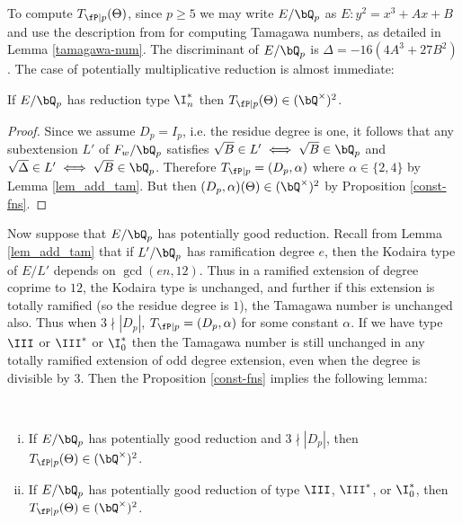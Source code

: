 To compute $T_{\fP \mid p}(\Theta)$, since $p \geq 5$ we may write $E / \bQ_p$ as $E \colon y^2 = x^3 + A x + B$ and use the description from \cite{reg-const} for computing Tamagawa numbers, as detailed in Lemma \ref{tamagawa-num}. The discriminant of $E / \bQ_p$ is $\Delta = -16(4A^3 + 27 B^2)$. The case of potentially multiplicative reduction is almost immediate:

\begin{lemma}
    If $E / \bQ_p$ has reduction type $\I_{n}^{*}$ then $T_{\fP \mid p}(\Theta) \in (\bQ^{\times})^2$. 
\end{lemma}

\begin{proof}
Since we assume $D_p = I_p$, i.e. the residue degree is one, it follows that any subextension $L'$ of $F_{w} / \bQ_p$ satisfies $\sqrt{B} \in L' \iff \sqrt{B} \in \bQ_p$ and $\sqrt{\Delta} \in L' \iff \sqrt{B} \in \bQ_p$. 
Therefore $T_{\fP \mid p} = (D_p, \alpha)$ where $\alpha \in \{2, 4\}$ by Lemma \ref{lem_add_tam}. But then $(D_p, \alpha)(\Theta) \in (\bQ^{\times})^2$ by Proposition \ref{const-fns}.
\end{proof}

Now suppose that $E / \bQ_p$ has potentially good reduction. Recall from Lemma \ref{lem_add_tam} that if $L' / \bQ_p$ has ramification degree $e$, then the Kodaira type of $E / L'$ depends on $\gcd(e n, 12)$. Thus in a ramified extension of degree coprime to $12$, the Kodaira type is unchanged, and further if this extension is totally ramified (so the residue degree is $1$), the Tamagawa number is unchanged also. Thus when $3 \nmid |D_p|$, $T_{\fP \mid p} = (D_p, \alpha)$ for some constant $\alpha$. If we have type $\III$ or $\III^*$ or $\I_0^*$ then the Tamagawa number is still unchanged in any totally ramified extension of odd degree extension, even when the degree is divisible by $3$. Then the Proposition \ref{const-fns} implies the following lemma:

\begin{lemma}
    \
    \begin{enumerate}[(i)]
        \setlength\itemsep{0em}
        \item If $E / \bQ_p$ has potentially good reduction and $3 \nmid |D_p|$, then $T_{\fP \mid p}(\Theta) \in (\bQ^{\times})^2$.
        \item If $E / \bQ_p$ has potentially good reduction of type $\III$, $\III^*$, or $\I_0^*$, then $T_{\fP \mid p}(\Theta) \in (\bQ^{\times})^2$.
    \end{enumerate}
\end{lemma}

